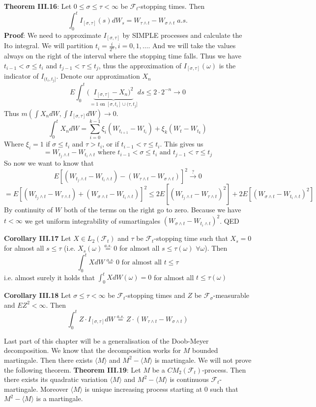 \documentclass[english]{article}
\newcommand{\ub}{\underbrace}
\newcommand{\note}[1]{\noindent\textbf{#1}}
\newcommand{\F}{\mathcal F}
\newcommand{\as}[1]{\stackrel {a.s.}{#1}}
\newcommand{\covar}[1]{\langle {#1} \rangle }
\begin{document}
\note{Theorem III.16}: Let $0\leq \sigma\leq \tau< \infty$ be $\F_t$-stopping times. Then 
$$\int^t_0 I_{[\sigma, \tau]} (s) dW_s = W_{\tau \wedge t} - W_{\sigma \wedge t} \; a.s.$$
\note{Proof}: We need to approximate $I_{[\sigma, \tau]}$ by SIMPLE processes and calculate the Ito integral.\newline
We will partition $t_i = \frac i {2^n}, i=0,1,\dots$. And we will take the values always on the right of the interval where the stopping time falls. Thus we have $t_{i-1} < \sigma \leq t_{i}$ and $t_{j-1} < \tau \leq t_{j}$, thus the approximation of $I_{[\sigma, \tau]}(\omega)$ is the indicator of $I_{(t_i, t_j]}$. Denote our approximation $X_n$
$$E\int^t_0 (\ub{I_{[\sigma, \tau]}- X_n)^2}_{=1\text{ on }[\sigma, t_i] \cup (\tau, t_j]} ds \leq 2\cdot 2^{-n} \to 0$$
Thus $m(\int X_n dW, \int I_{[\sigma, \tau]} dW) \to 0$.
$$\int^t_0 X_n dW = \sum^{k-1}_{i=0} \xi_i (W_{t_{i+1}} - W_{t_i}) + \xi_k (W_t - W_{t_k})$$
Where $\xi_i = 1$ if $ \sigma \leq t_i$ and $\tau > t_i$, or if $t_{i-1} < \tau \leq t_i$. This gives us
$$= W_{t_j \wedge t} - W_{t_i \wedge t} \text{ where } t_{i-1} < \sigma \leq t_i\text{ and } t_{j-1} < \tau \leq t_j$$
So now we want to know that
$$E [(W_{t_j \wedge t} - W_{t_i \wedge t}) - (W_{\tau \wedge t} - W_{\sigma \wedge t} )]^2 \stackrel ?\to 0$$
$$=E[(W_{t_j\wedge t} - W_{\tau\wedge t}) + (W_{\sigma \wedge t} - W_{t_i \wedge t})]^2 \leq 2 E[(W_{t_j \wedge t} - W_{\tau \wedge t})^2] + 2 E[(W_{\sigma \wedge t} - W_{t_i \wedge t})^2]$$
By continuity of $W$ both of the terms on the right go to zero. Because we have $t< \infty$ we get uniform integrability of sumartingales $(W_{\sigma \wedge t} - W_{t_i \wedge t})^2$. QED \newline

\note{Corollary III.17} Let $X \in L_2(\F_t)$ and $\tau$ be $\F_t$-stopping time such that $X_s = 0$ for almost all $s\leq \tau$ (i.e. $X_s(\omega) \as= 0 $ for almost all $s\leq \tau(\omega)$ $\forall \omega$). Then 
$$\int^t_0 X dW \as= 0 \text{ for almost all }t\leq \tau$$
i.e. almost surely it holds that $\int^t_0 X dW (\omega) = 0$ for almost all $t\leq \tau(\omega)$ \newline

\note{Corollary III.18} Let $\sigma \leq \tau < \infty$ be $\F_t$-stopping times and $Z$ be $\F_\sigma$-measurable and $EZ^2<\infty$. Then 
$$ \int^t_0 Z \cdot I_{[\sigma, \tau]} dW \as= Z\cdot (W_{\tau \wedge t} - W_{\sigma \wedge t}) $$ \newline

Last part of this chapter will be a generalisation of the Doob-Meyer decomposition. We know that the decomposition works for $M$ bounded martingale. Then there exists $\covar M$ and $M^2 - \covar M$ is martingale. We will not prove the following theorem. \newline
\note{Theorem III.19}: Let $M$ be a $CM_2(\F_t)$-process. Then there exists its quadratic variation $\covar M$ and $M^2 - \covar M$ is continuous $\F_t$-martingale. Moreover $\covar M$ is unique increasing process starting at $0$ such that $M^2 - \covar M$ is a martingale. \newline
\end{document}

